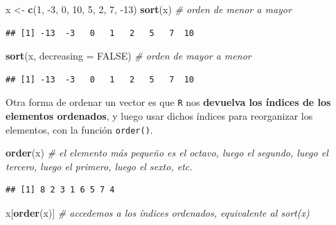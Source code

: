 \documentclass[11pt,]{book}
\newenvironment{Shaded}{\begin{snugshade}}{\end{snugshade}}
\newcommand{\CommentTok}[1]{\textcolor[rgb]{0.37,0.37,0.37}{\textit{#1}}}
\newcommand{\DataTypeTok}[1]{\textcolor[rgb]{0.27,0.27,0.27}{#1}}
\newcommand{\DecValTok}[1]{\textcolor[rgb]{0.06,0.06,0.06}{#1}}
\newcommand{\KeywordTok}[1]{\textcolor[rgb]{0.27,0.27,0.27}{\textbf{#1}}}
\newcommand{\NormalTok}[1]{#1}
\newcommand{\OtherTok}[1]{\textcolor[rgb]{0.37,0.37,0.37}{#1}}
\newcommand{\StringTok}[1]{\textcolor[rgb]{0.5,0.5,0.5}{#1}}
\begin{document}
\begin{Shaded}
\begin{Highlighting}[]
\NormalTok{x <-}\StringTok{ }\KeywordTok{c}\NormalTok{(}\DecValTok{1}\NormalTok{, }\DecValTok{-3}\NormalTok{, }\DecValTok{0}\NormalTok{, }\DecValTok{10}\NormalTok{, }\DecValTok{5}\NormalTok{, }\DecValTok{2}\NormalTok{, }\DecValTok{7}\NormalTok{, }\DecValTok{-13}\NormalTok{)}
\KeywordTok{sort}\NormalTok{(x) }\CommentTok{# orden de menor a mayor}
\end{Highlighting}
\end{Shaded}

\begin{verbatim}
## [1] -13  -3   0   1   2   5   7  10
\end{verbatim}

\begin{Shaded}
\begin{Highlighting}[]
\KeywordTok{sort}\NormalTok{(x, }\DataTypeTok{decreasing =} \OtherTok{FALSE}\NormalTok{) }\CommentTok{# orden de mayor a menor}
\end{Highlighting}
\end{Shaded}

\begin{verbatim}
## [1] -13  -3   0   1   2   5   7  10
\end{verbatim}

Otra forma de ordenar un vector es que \texttt{R} nos \textbf{devuelva los índices de los elementos ordenados}, y luego usar dichos índices para reorganizar los elementos, con la función \texttt{order()}.

\begin{Shaded}
\begin{Highlighting}[]
\KeywordTok{order}\NormalTok{(x) }\CommentTok{# el elemento más pequeño es el octavo, luego el segundo, luego el tercero, luego el primero, luego el sexto, etc.}
\end{Highlighting}
\end{Shaded}

\begin{verbatim}
## [1] 8 2 3 1 6 5 7 4
\end{verbatim}

\begin{Shaded}
\begin{Highlighting}[]
\NormalTok{x[}\KeywordTok{order}\NormalTok{(x)] }\CommentTok{# accedemos a los índices ordenados, equivalente al sort(x)}
\end{Highlighting}
\end{Shaded}
\end{document}
